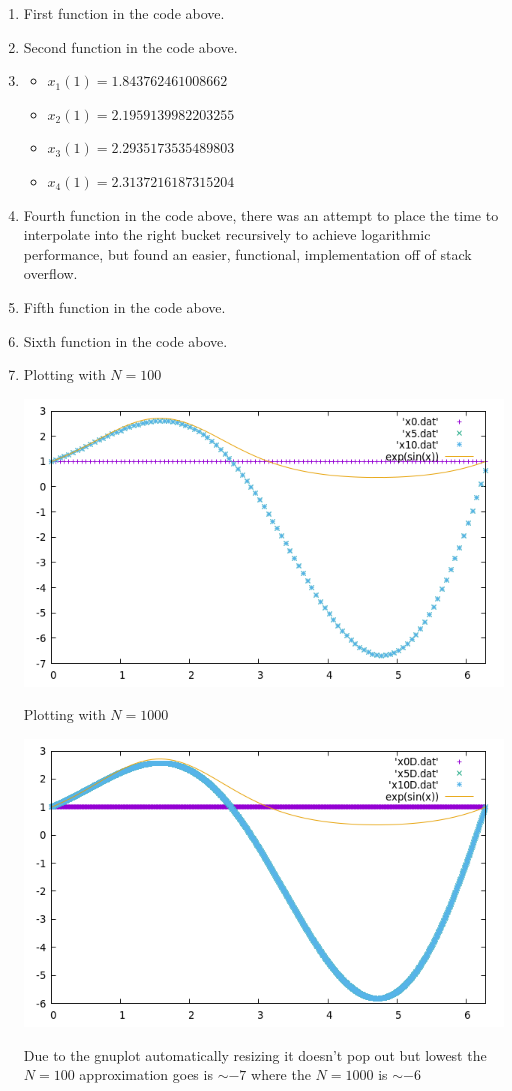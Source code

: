 \documentclass[12pt, letterpaper]{article}
\begin{document}
	\begin{enumerate}
		\item First function in the code above.
		\item Second function in the code above.
		\item 
			\begin{itemize}
				\item $x_1 (1) = 1.843762461008662$
				\item $x_2 (1) = 2.1959139982203255$
				\item $x_3 (1) = 2.2935173535489803$
				\item $x_4 (1) = 2.3137216187315204$ 
			\end{itemize}
		\item Fourth function in the code above, there was an attempt to place the time to interpolate into the right bucket recursively to achieve logarithmic performance, but found an easier, functional, implementation off of stack overflow.
		\item Fifth function in the code above.
		\item Sixth function in the code above.
		\item Plotting with $N = 100$\\
		\begin{center}
		\includegraphics[scale=0.5]{N100interpolatedPicard.png}
		\end{center}
		
		Plotting with $N = 1000$
		\begin{center}
			\includegraphics[scale=0.5]{N1000interpolatedPicard.png}		
		\end{center}
		Due to the gnuplot automatically resizing it doesn't pop out but lowest the $N=100$ approximation goes is $\sim-7$ where the $N=1000$ is $\sim-6$
	\end{enumerate}
\end{document}
